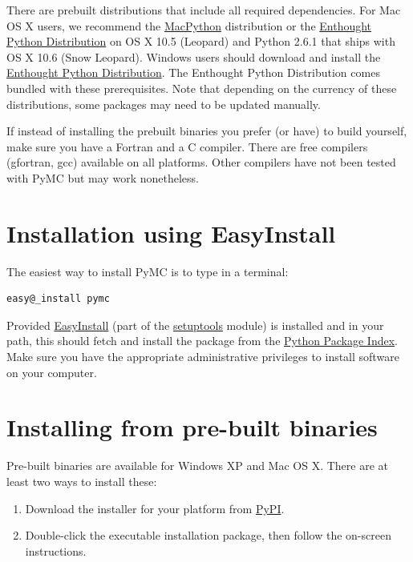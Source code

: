 \documentclass[letterpaper,10pt,english]{sphinxmanual}
\begin{document}
There are prebuilt distributions that include all required dependencies. For
Mac OS X users, we recommend the \href{http://www.activestate.com/Products/ActivePython/}{MacPython} distribution or the
\href{http://www.enthought.com/products/epddownload.php}{Enthought Python Distribution} on OS X 10.5 (Leopard) and Python 2.6.1 that
ships with OS X 10.6 (Snow Leopard). Windows users should download and install the
\href{http://www.enthought.com/products/epddownload.php}{Enthought Python Distribution}. The Enthought Python Distribution comes
bundled with these prerequisites. Note that depending on the currency of these
distributions, some packages may need to be updated manually.

If instead of installing the prebuilt binaries you prefer (or have) to build
 yourself, make sure you have a Fortran and a C compiler. There are free
compilers (gfortran, gcc) available on all platforms. Other compilers have not been
tested with PyMC but may work nonetheless.


\section{Installation using EasyInstall}
\label{INSTALL:nose-optional}\label{INSTALL:installation-using-easyinstall}
The easiest way to install PyMC is to type in a terminal:

\begin{Verbatim}[commandchars=@\[\]]
easy@_install pymc
\end{Verbatim}

Provided \href{http://peak.telecommunity.com/DevCenter/EasyInstall}{EasyInstall} (part of the \href{http://peak.telecommunity.com/DevCenter/setuptools}{setuptools} module) is installed
and in your path, this should fetch and install the package from the
\href{http://pypi.python.org/pypi}{Python Package Index}. Make sure you have the appropriate administrative
privileges to install software on your computer.


\section{Installing from pre-built binaries}
\label{INSTALL:installing-from-pre-built-binaries}\label{INSTALL:setuptools}
Pre-built binaries are available for Windows XP and Mac OS X. There are at least
two ways to install these:
\begin{enumerate}
\item {} 
Download the installer for your platform from \href{http://pypi.python.org/pypi/pymc/}{PyPI}.

\item {} 
Double-click the executable installation package, then follow the
on-screen instructions.

\end{enumerate}
\end{document}

